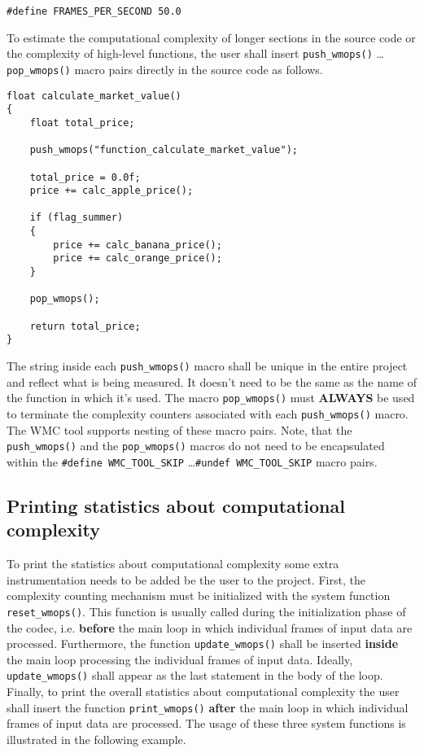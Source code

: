 \begin{Verbatim}[fontsize=\small]
#define FRAMES_PER_SECOND 50.0
\end{Verbatim}

To estimate the computational complexity of longer sections in the source code or the complexity of high-level functions, the user shall insert \verb|push_wmops()| \ldots \verb|pop_wmops()| macro pairs directly in the source code as follows.

\begin{Verbatim}[fontsize=\small]
float calculate_market_value()
{
    float total_price;
    
    push_wmops("function_calculate_market_value");
    
    total_price = 0.0f;
    price += calc_apple_price();
    
    if (flag_summer)
    {
        price += calc_banana_price();
        price += calc_orange_price();
    }
    
    pop_wmops();
    
    return total_price;
}
\end{Verbatim}

The string inside each \verb|push_wmops()| macro shall be unique in the entire project and reflect what is being measured. It doesn't need to be the same as the name of the function in which it's used. The macro \verb|pop_wmops()| must \textbf{ALWAYS} be used to terminate the complexity counters associated with each \verb|push_wmops()| macro. The WMC tool supports nesting of these macro pairs. Note, that the \verb|push_wmops()| and the \verb|pop_wmops()| macros do not need to be encapsulated within the \verb|#define WMC_TOOL_SKIP| \ldots \verb|#undef WMC_TOOL_SKIP| macro pairs.

\subsection{Printing statistics about computational complexity}
\label{ch:printing_statistics_about_computational_complexity}

To print the statistics about computational complexity some extra instrumentation needs to be added be the user to the project. First, the complexity counting mechanism must be initialized with the system function \verb|reset_wmops()|. This function is usually called during the initialization phase of the codec, i.e. \textbf{before} the main loop in which individual frames of input data are processed. Furthermore, the function \verb|update_wmops()| shall be inserted \textbf{inside} the main loop processing the individual frames of input data. Ideally, \verb|update_wmops()| shall appear as the last statement in the body of the loop. Finally, to print the overall statistics about computational complexity the user shall insert the function \verb|print_wmops()| \textbf{after} the main loop in which individual frames of input data are processed. The usage of these three system functions is illustrated in the following example.

